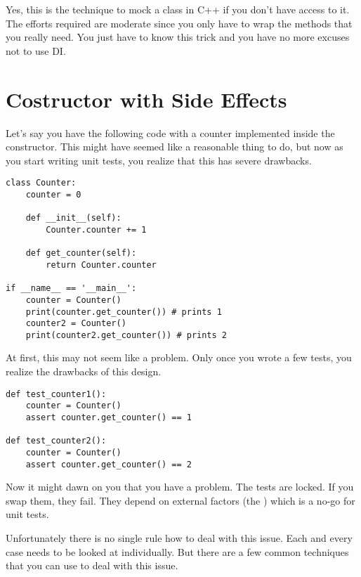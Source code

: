 Yes, this is the technique to mock a class in C++ if you don't have access to it. The efforts required are moderate since you only have to wrap the methods that you really need. You just have to know this trick and you have no more excuses not to use DI.

\section{Costructor with Side Effects}

Let's say you have the following code with a counter implemented inside the constructor. This might have seemed like a reasonable thing to do, but now as you start writing unit tests, you realize that this has severe drawbacks.

\begin{programcode}{}
\begin{verbatim}
class Counter:
    counter = 0

    def __init__(self):
        Counter.counter += 1

    def get_counter(self):
        return Counter.counter

if __name__ == '__main__':
    counter = Counter()
    print(counter.get_counter()) # prints 1
    counter2 = Counter()
    print(counter2.get_counter()) # prints 2
\end{verbatim}
\end{programcode}

At first, this may not seem like a problem. Only once you wrote a few tests, you realize the drawbacks of this design.

\begin{programcode}{}
\begin{verbatim}
def test_counter1():
    counter = Counter()
    assert counter.get_counter() == 1

def test_counter2():
    counter = Counter()
    assert counter.get_counter() == 2
\end{verbatim}
\end{programcode}

Now it might dawn on you that you have a problem. The tests are locked. If you swap them, they fail. They depend on external factors (the ) which is a no-go for unit tests.

Unfortunately there is no single rule how to deal with this issue. Each and every case needs to be looked at individually. But there are a few common techniques that you can use to deal with this issue.

